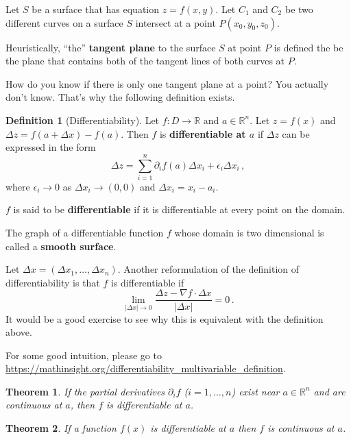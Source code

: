 \documentclass[
]{article}
\newtheorem{theorem}{Theorem}[section]
\theoremstyle{definition}
\newtheorem{definition}{Definition}[section]
\theoremstyle{definition}
\theoremstyle{definition}
\theoremstyle{definition}
\theoremstyle{remark}
\begin{document}
Let \(S\) be a surface that has equation \(z = f(x,y)\).
Let \(C_1\) and \(C_2\) be two different curves on a surface \(S\)
intersect at a point \(P(x_0, y_0, z_0)\).

Heuristically, ``the'' \textbf{tangent plane} to the surface \(S\) at point \(P\) is defined the be the plane that contains
both of the tangent lines of both curves at \(P\).

How do you know if there is only one tangent plane at a point?
You actually don't know.
That's why the following definition exists.

\begin{definition}[Differentiability]
Let \(f:D \to \mathbb{R}\) and \(a\in \mathbb{R}^n\).
Let \(z = f(x)\) and \(\Delta z = f(a + \Delta x ) - f(a)\).
Then \(f\) is \textbf{differentiable at \(a\)} if \(\Delta z\) can be
expressed in the form
\begin{equation*}
    \Delta z = \sum_{i=1}^n \partial_i f(a) \Delta x_i +  \epsilon_i \Delta x_i  \,,
\end{equation*}
where \(\epsilon_i \to 0\) as \(\Delta x_i \to (0,0)\) and
\(\Delta x_i = x_i - a_i\).

\(f\) is said to be \textbf{differentiable} if it is differentiable at every point on the domain.
\end{definition}

The graph of a differentiable function \(f\) whose
domain is two dimensional is called a \textbf{smooth surface}.

Let \(\Delta x = (\Delta x_1, \dots, \Delta x_n)\).
Another reformulation of the definition of differentiability is that \(f\) is
differentiable if
\begin{equation*}
\lim_{|\Delta x| \to 0}
    \frac{\Delta z - \nabla f \cdot \Delta x }{| \Delta x|}  = 0 \,.
\end{equation*}
It would be a good exercise to see why this is equivalent with the definition above.

For some good intuition, please go to \url{https://mathinsight.org/differentiability_multivariable_definition}.

\begin{theorem}
If the partial derivatives \(\partial_i f\) (\(i= 1, \dots, n\)) exist near \(a\in \mathbb{R}^n\) and are continuous
at \(a\), then \(f\) is differentiable at \(a\).
\end{theorem}

\begin{theorem}
If a function \(f(x)\) is differentiable at \(a\) then \(f\) is continuous at \(a\).
\end{theorem}
\end{document}
